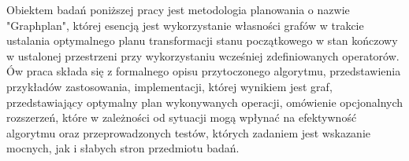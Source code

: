 \begin{streszczenie}
Obiektem badań poniższej pracy jest metodologia planowania
o nazwie "Graphplan", której esencją jest wykorzystanie
własności grafów w trakcie ustalania optymalnego planu transformacji
stanu początkowego w stan kończowy w ustalonej przestrzeni przy wykorzystaniu wcześniej zdefiniowanych
operatorów. \\
Ów praca składa się z formalnego opisu przytoczonego algorytmu, przedstawienia przykładów zastosowania,
implementacji, której wynikiem jest graf, przedstawiający optymalny plan wykonywanych operacji,
omówienie opcjonalnych rozszerzeń, które w zależności od sytuacji mogą wpłynać na efektywność algorytmu
oraz przeprowadzonych testów, których zadaniem jest wskazanie mocnych, jak i słabych stron przedmiotu badań.

\end{streszczenie}
